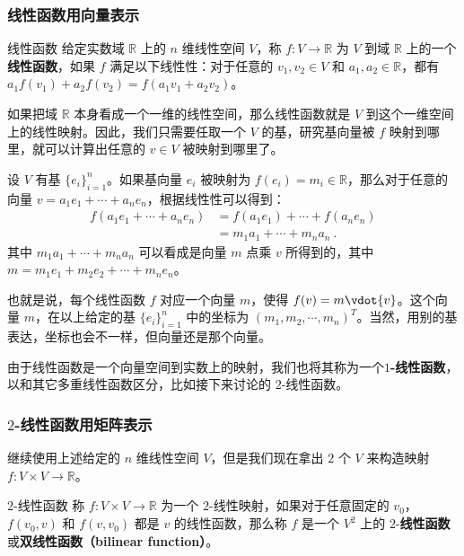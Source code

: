 \subsubsection{线性函数用向量表示}
\begin{definition}{线性函数}
给定实数域 $\mathbb{R}$ 上的 $n$ 维线性空间 $V$，称 $f:V\rightarrow \mathbb{R}$ 为 $V$ 到域 $\mathbb{R}$ 上的一个\textbf{线性函数}，如果 $f$ 满足以下线性性：对于任意的 ${v}_1, {v}_2\in V$ 和 $a_1, a_2\in\mathbb{R}$，都有 $a_1f({v}_1)+a_2f({v}_2)=f(a_1{v}_1+a_2{v}_2)$。
\end{definition}

如果把域 $\mathbb{R}$ 本身看成一个一维的线性空间，那么线性函数就是 $V$ 到这个一维空间上的线性映射。因此，我们只需要任取一个 $V$ 的基，研究基向量被 $f$ 映射到哪里，就可以计算出任意的 ${v}\in V$ 被映射到哪里了。

设 $V$ 有基 $\{{e}_i\}_{i=1}^n$。如果基向量 ${e}_i$ 被映射为 $f({e}_i)=m_i\in\mathbb{R}$，那么对于任意的向量 ${v}=a_1{e}_1+\cdots+a_n{e}_n$，根据线性性可以得到：
\begin{equation}
\begin{aligned}
f(a_1{e}_1+\cdots+a_n{e}_n)&=f(a_1{e}_1)+\cdots+f(a_n{e}_n)\\
&=m_1a_1+\cdots+m_na_n~.
\end{aligned}
\end{equation}
其中 $m_1a_1+\cdots+m_na_n$ 可以看成是向量 ${m}$ 点乘 ${v}$ 所得到的，其中 ${m}=m_1{e}_1+m_2{e}_2+\cdots+m_n{e}_n$。

也就是说，每个线性函数 $f$ 对应一个向量 ${m}$，使得 $f({v})={m}\vdot{v}$。这个向量 ${m}$，在以上给定的基 $\{{e}_i\}_{i=1}^n$ 中的坐标为 $(m_1, m_2, \cdots, m_n)^T$。当然，用别的基表达，坐标也会不一样，但向量还是那个向量。

由于线性函数是一个向量空间到实数上的映射，我们也将其称为一个\textbf{$1$-线性函数}，以和其它多重线性函数区分，比如接下来讨论的 $2$-线性函数。

\subsubsection{$2$-线性函数用矩阵表示}

继续使用上述给定的 $n$ 维线性空间 $V$，但是我们现在拿出 $2$ 个 $V$ 来构造映射 $f:V\times V\rightarrow\mathbb{R}$。

\begin{definition}{$2$-线性函数}\label{Tensor_def1}
称 $f:V\times V\rightarrow\mathbb{R}$ 为一个 $2$-线性映射，如果对于任意固定的 ${v}_0$，$f({v}_0, {v})$ 和 $f({v}, {v}_0)$ 都是 ${v}$ 的线性函数，那么称 $f$ 是一个 $V^2$ 上的 $2$-\textbf{线性函数}或\textbf{双线性函数（bilinear function）}。
\end{definition}


